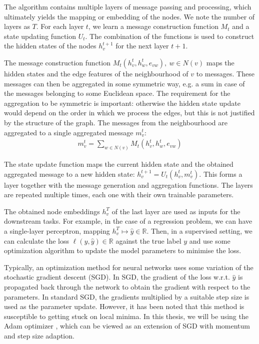 \documentclass[english, 12pt, a4paper, sci, utf8, a-2b, online]{aaltothesis}
\newcommand{\R}{\mathbb{R}}
\begin{document}
The algorithm contains multiple layers of message passing and processing, which ultimately yields the mapping or embedding of the nodes. We note the number of layers as $T$. For each layer $t$, we learn a message construction function $M_t$ and a state updating function $U_t$. The combination of the functions is used to construct the hidden states of the nodes $h_v^{t+1}$ for the next layer $t+1$.

The message construction function $M_t(h_v^t, h_w^t, e_{vw}),\ w \in N(v)$ maps the hidden states and the edge features of the neighbourhood of $v$ to messages. These messages can then be aggregated in some symmetric way, e.g. a sum in case of the messages belonging to some Euclidean space. The requirement for the aggregation to be symmetric is important: otherwise the hidden state update would depend on the order in which we process the edges, but this is not justified by the structure of the graph. The messages from the neighbourhood are aggregated to a single aggregated message $m_v^t$:
\begin{align}
    m_v^t = \sum_{w \in N(v)}M_t(h_v^t, h_w^t, e_{vw})
\end{align}

The state update function maps the current hidden state and the obtained aggregated message to a new hidden state: $h_v^{t+1} = U_t(h_v^t, m_v^t)$. This forms a layer together with the message generation and aggregation functions. The layers are repeated multiple times, each one with their own trainable parameters.

The obtained node embeddings $h_v^T$ of the last layer are used as inputs for the downstream tasks. For example, in the case of a regression problem, we can have a single-layer perceptron, mapping $h_v^T \mapsto \hat{y} \in \R$. Then, in a supervised setting, we can calculate the loss $\ell(y, \hat{y}) \in \R$ against the true label $y$ and use some optimization algorithm to update the model parameters to minimise the loss.

Typically, an optimization method for neural networks uses some variation of the stochastic gradient descent (SGD). In SGD, the gradient of the loss w.r.t. $\hat{y}$ is propagated back through the network to obtain the gradient with respect to the parameters. In standard SGD, the gradients multiplied by a suitable step size is used as the parameter update. However, it has been noted that this method is susceptible to getting stuck on local minima. In this thesis, we will be using the Adam optimizer \cite{adam-2014}, which can be viewed as an extension of SGD with momentum and step size adaption.
\end{document}

